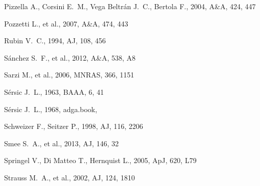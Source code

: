 \documentclass[a4paper,fleqn,usenatbib]{mnras}
\begin{document}
\begin{thebibliography}{}
 Pizzella A., Corsini E.~M., Vega Beltr{\'a}n J.~C., Bertola F., 2004, A\&A, 424, 447 


 Pozzetti L., et al., 2007, A\&A, 474, 443

 Rubin V.~C., 1994, AJ, 108, 456 


 S{\'a}nchez S.~F., et al., 2012, A\&A, 538, A8



 Sarzi M., et al., 2006, MNRAS, 366, 1151 

 S{\'e}rsic J.~L., 1963, BAAA, 6, 41 

 S{\'e}rsic J.~L., 1968, adga.book,  

 Schweizer F., Seitzer P., 1998, AJ, 116, 2206 

 Smee S.~A., et al., 2013, AJ, 146, 32 


 Springel V., Di Matteo T., Hernquist L., 2005, ApJ, 620, L79 

 Strauss M.~A., et al., 2002, AJ, 124, 1810 


\end{thebibliography}
\end{document}
